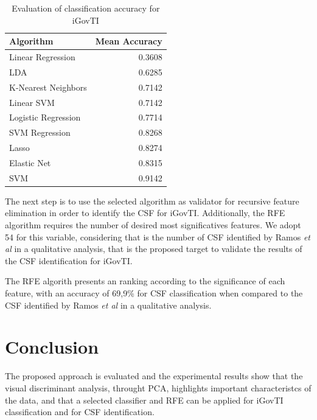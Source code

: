 \begin{table}[!t]
	\caption{Evaluation of classification accuracy for iGovTI}
  	\label{tab:ch2_tab1}
	\centering
	\begin{tabular}{|l|r|}
		\hline \rowcolor{Gray} Algorithm	& Mean Accuracy\\\hline
		Linear Regression \cite{draper2014applied}	&0.3608\\ \hline
		LDA \cite{martinez2001pca}	&0.6285\\ \hline
		K-Nearest Neighbors \cite{fukunaga1975branch}	&0.7142\\ \hline
		Linear SVM \cite{fan2008liblinear}	&0.7142\\ \hline
		Logistic Regression \cite{hosmer2013applied}	&0.7714\\ \hline
		SVM Regression \cite{smola2004tutorial}	&0.8268\\ \hline
		Lasso \cite{tibshirani1996regression}	&0.8274\\ \hline
		Elastic Net \cite{zou2005regularization}	&0.8315\\ \hline
		SVM \cite{hearst1998support}	&0.9142\\ \hline
	\end{tabular}
\end{table}

The next step is to use the selected algorithm as validator for recursive feature elimination in order to identify the CSF for iGovTI. Additionally, the RFE algorithm requires the number of desired most significatives features. We adopt 54 for this variable, considering that is the number of CSF identified by Ramos \emph{et al} \cite{ramos2016information} in a qualitative analysis, that is the proposed target to validate the results of the CSF identification for iGovTI.

The RFE algorith presents an ranking according to the significance of each feature, with an accuracy of 69,9\% for CSF classification when compared to the CSF identified by Ramos \emph{et al} \cite{ramos2016information} in a qualitative analysis.


\section{Conclusion}
\label{sec:b_conclusion}

The proposed approach is evaluated and the experimental results show that the visual discriminant analysis, throught PCA, highlights important characteristcs of the data, and that a selected classifier and RFE can be applied for iGovTI classification and for CSF identification. 

